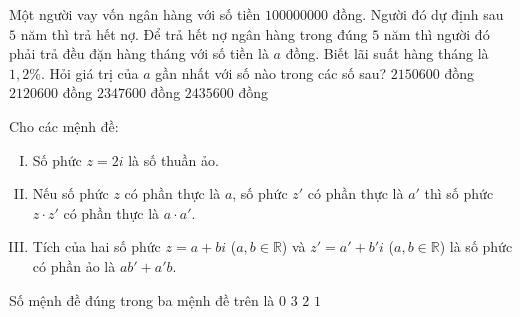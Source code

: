 \begin{ex}%
Một người vay vốn ngân hàng với số tiền $100000000$ đồng. Người đó dự định sau $5$ năm thì trả hết nợ. Để trả hết nợ ngân hàng trong đúng $5$ năm thì người đó phải trả đều đặn hàng tháng với số tiền là $a$ đồng. Biết lãi suất hàng tháng là $1{,}2\%$. Hỏi giá trị của $a$ gần nhất với số nào trong các số sau?
\choice
{$2150600$ đồng}
{$2120600$ đồng}
{$2347600$ đồng}
{\True $2435600$ đồng}
\end{ex}

\begin{ex}%
Cho các mệnh đề:
\begin{enumerate}[(I)]
 \item Số phức $z=2i$ là số thuần ảo.
 \item Nếu số phức $z$ có phần thực là $a$, số phức $z'$ có phần thực là $a'$ thì số phức $z\cdot z'$ có phần thực là $a\cdot a'$.
 \item Tích của hai số phức $z=a+bi$ ($a,b\in\mathbb{R}$) và $z'=a'+b'i$ ($a,b\in\mathbb{R}$) là số phức có phần ảo là $ab'+a'b$.
\end{enumerate}
Số mệnh đề đúng trong ba mệnh đề trên là
\choice
{$0$}
{$3$}
{\True $2$}
{$1$}
\end{ex}

